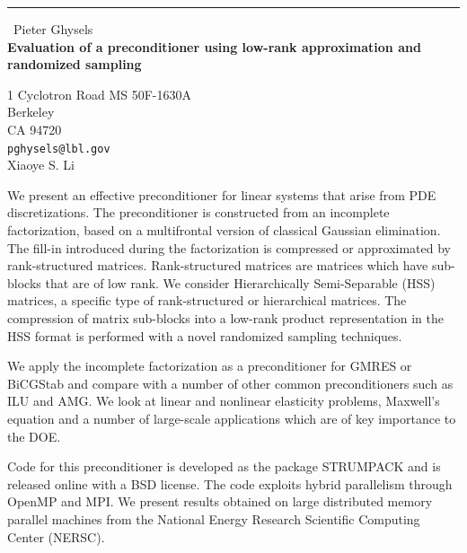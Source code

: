 \documentclass{report}
\begin{document}
\begin{center}
\rule{6in}{1pt} \
{\large Pieter Ghysels \\
{\bf Evaluation of a preconditioner using low-rank approximation and randomized sampling}}

1 Cyclotron Road MS 50F-1630A \\ Berkeley \\ CA 94720
\\
{\tt pghysels@lbl.gov}\\
Xiaoye S. Li\end{center}

We present an effective preconditioner for linear systems that arise from
PDE discretizations. The preconditioner is constructed from an incomplete
factorization, based on a multifrontal version of classical Gaussian
elimination. The fill-in introduced during the factorization is
compressed or approximated by rank-structured matrices. Rank-structured
matrices are matrices which have sub-blocks that are of low rank. We
consider Hierarchically Semi-Separable (HSS) matrices, a specific type of
rank-structured or hierarchical matrices. The compression of matrix
sub-blocks into a low-rank product representation in the HSS format is
performed with a novel randomized sampling techniques.

We apply the incomplete factorization as a preconditioner for GMRES or
BiCGStab and compare with a number of other common preconditioners such
as ILU and AMG. We look at linear and nonlinear elasticity problems,
Maxwell's equation and a number of large-scale applications which are of
key importance to the DOE.

Code for this preconditioner is developed as the package STRUMPACK and is
released online with a BSD license. The code exploits hybrid parallelism
through OpenMP and MPI. We present results obtained on large distributed
memory parallel machines from the National Energy Research Scientific
Computing Center (NERSC).
\end{document}
